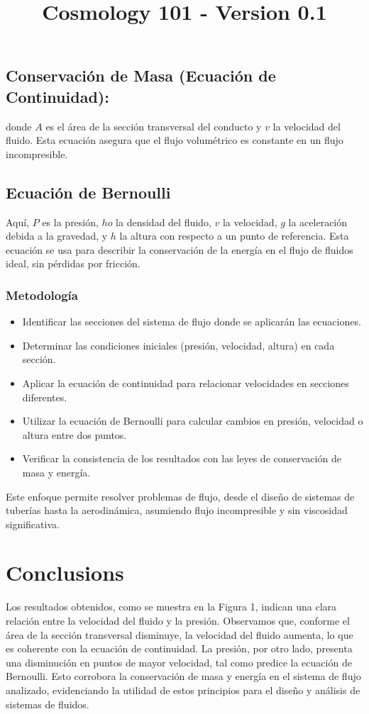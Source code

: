 \documentclass{article}\usepackage{graphicx} \usepackage{amsmath} \usepackage{colortbl}\title{Cosmology 101 - Version 0.1}
\begin{document}
\subsection{Conservación de Masa (Ecuación de Continuidad):}
donde $A$ es el área de la sección transversal del conducto y $v$ la velocidad del fluido. Esta ecuación asegura que el flujo volumétrico es constante en un flujo incompresible.\subsection{Ecuación de Bernoulli}
Aquí, $P$ es la presión, $
ho$ la densidad del fluido, $v$ la velocidad, $g$ la aceleración debida a la gravedad, y $h$ la altura con respecto a un punto de referencia. Esta ecuación se usa para describir la conservación de la energía en el flujo de fluidos ideal, sin pérdidas por fricción.
\subsubsection{Metodología}
\begin{itemize}
\item Identificar las secciones del sistema de flujo donde se aplicarán las ecuaciones.
\item Determinar las condiciones iniciales (presión, velocidad, altura) en cada sección.
\item Aplicar la ecuación de continuidad para relacionar velocidades en secciones diferentes.
\item Utilizar la ecuación de Bernoulli para calcular cambios en presión, velocidad o altura entre dos puntos.
\item Verificar la consistencia de los resultados con las leyes de conservación de masa y energía.
\end{itemize}

Este enfoque permite resolver problemas de flujo, desde el diseño de sistemas de tuberías hasta la aerodinámica, asumiendo flujo incompresible y sin viscosidad significativa.\section{Conclusions}
Los resultados obtenidos, como se muestra en la Figura 1, indican una clara relación entre la velocidad del fluido y la presión. Observamos que, conforme el área de la sección transversal disminuye, la velocidad del fluido aumenta, lo que es coherente con la ecuación de continuidad. La presión, por otro lado, presenta una disminución en puntos de mayor velocidad, tal como predice la ecuación de Bernoulli. Esto corrobora la conservación de masa y energía en el sistema de flujo analizado, evidenciando la utilidad de estos principios para el diseño y análisis de sistemas de fluidos.
\end{document}
